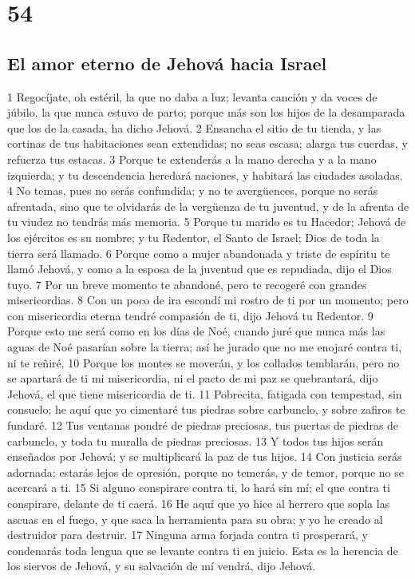 \chapter{54}

\section*{El amor eterno de Jehová hacia Israel}

1 Regocíjate, oh estéril, la que no daba a luz; levanta canción y da voces de júbilo, la que nunca estuvo de parto; porque más son los hijos de la desamparada que los de la casada, ha dicho Jehová.
2 Ensancha el sitio de tu tienda, y las cortinas de tus habitaciones sean extendidas; no seas escasa; alarga tus cuerdas, y refuerza tus estacas.
3 Porque te extenderás a la mano derecha y a la mano izquierda; y tu descendencia heredará naciones, y habitará las ciudades asoladas.
4 No temas, pues no serás confundida; y no te avergüences, porque no serás afrentada, sino que te olvidarás de la vergüenza de tu juventud, y de la afrenta de tu viudez no tendrás más memoria.
5 Porque tu marido es tu Hacedor; Jehová de los ejércitos es su nombre; y tu Redentor, el Santo de Israel; Dios de toda la tierra será llamado.
6 Porque como a mujer abandonada y triste de espíritu te llamó Jehová, y como a la esposa de la juventud que es repudiada, dijo el Dios tuyo.
7 Por un breve momento te abandoné, pero te recogeré con grandes misericordias.
8 Con un poco de ira escondí mi rostro de ti por un momento; pero con misericordia eterna tendré compasión de ti, dijo Jehová tu Redentor.
9 Porque esto me será como en los días de Noé, cuando juré que nunca más las aguas de Noé pasarían sobre la tierra; así he jurado que no me enojaré contra ti, ni te reñiré.
10 Porque los montes se moverán, y los collados temblarán, pero no se apartará de ti mi misericordia, ni el pacto de mi paz se quebrantará, dijo Jehová, el que tiene misericordia de ti.
11 Pobrecita, fatigada con tempestad, sin consuelo; he aquí que yo cimentaré tus piedras sobre carbunclo, y sobre zafiros te fundaré.
12 Tus ventanas pondré de piedras preciosas, tus puertas de piedras de carbunclo, y toda tu muralla de piedras preciosas. 
13 Y todos tus hijos serán enseñados por Jehová; y se multiplicará la paz de tus hijos.
14 Con justicia serás adornada; estarás lejos de opresión, porque no temerás, y de temor, porque no se acercará a ti.
15 Si alguno conspirare contra ti, lo hará sin mí; el que contra ti conspirare, delante de ti caerá.
16 He aquí que yo hice al herrero que sopla las ascuas en el fuego, y que saca la herramienta para su obra; y yo he creado al destruidor para destruir.
17 Ninguna arma forjada contra ti prosperará, y condenarás toda lengua que se levante contra ti en juicio. Esta es la herencia de los siervos de Jehová, y su salvación de mí vendrá, dijo Jehová.

